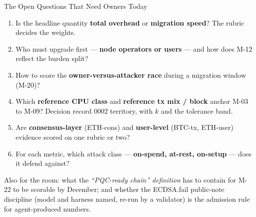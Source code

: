 \documentclass[aspectratio=169,10pt]{beamer}
\begin{document}
\begin{frame}{The Open Questions That Need Owners Today}
  \begin{enumerate}\small
    \item Is the headline quantity \textbf{total overhead} or \textbf{migration speed}? The rubric decides the weights.
    \item Who must upgrade first --- \textbf{node operators or users} --- and how does M-12 reflect the burden split?
    \item How to score the \textbf{owner-versus-attacker race} during a migration window (M-20)?
    \item Which \textbf{reference CPU class} and \textbf{reference tx mix / block} anchor M-03 to M-09? Decision record 0002 territory, with $k$ and the tolerance band.
    \item Are \textbf{consensus-layer} (ETH-cons) and \textbf{user-level} (BTC-tx, ETH-user) evidence scored on one rubric or two?
    \item For each metric, which attack class --- \textbf{on-spend, at-rest, on-setup} --- does it defend against?
  \end{enumerate}
  \par\vspace{1mm}
  {\small Also for the room: what the \emph{``PQC-ready chain'' definition} has to contain for M-22 to be scorable by December; and whether the ECDSA.fail public-note discipline (model and harness named, re-run by a validator) is the admission rule for agent-produced numbers.}
\end{frame}
\end{document}
